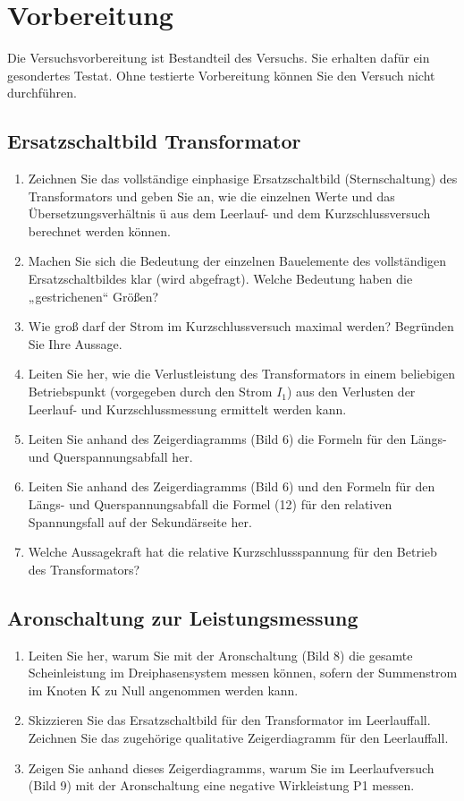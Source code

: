 \section{Vorbereitung}
{Die Versuchsvorbereitung ist Bestandteil des Versuchs. Sie erhalten dafür ein gesondertes Testat.
Ohne testierte Vorbereitung können Sie den Versuch nicht durchführen.}
\subsection{Ersatzschaltbild Transformator}
\begin{enumerate}[label=\alph*)]
  \item Zeichnen Sie das vollständige einphasige Ersatzschaltbild (Sternschaltung) des Transformators und geben Sie an, wie die einzelnen Werte und das Übersetzungsverhältnis ü aus dem Leerlauf- und dem Kurzschlussversuch berechnet werden können. 
  \item Machen Sie sich die Bedeutung der einzelnen Bauelemente des vollständigen Ersatzschaltbildes klar (wird abgefragt). Welche Bedeutung haben die „gestrichenen“ Größen? 
  \item Wie groß darf der Strom im Kurzschlussversuch maximal werden? Begründen Sie Ihre Aussage. 
  \item Leiten Sie her, wie die Verlustleistung des Transformators in einem beliebigen Betriebspunkt (vorgegeben durch den Strom $I_1$) aus den Verlusten der Leerlauf- und Kurzschlussmessung ermittelt werden kann.  
  \item Leiten Sie anhand des Zeigerdiagramms (Bild 6) die Formeln für den Längs- und Querspannungsabfall her.  
  \item Leiten Sie anhand des Zeigerdiagramms (Bild 6) und den Formeln für den Längs- und Querspannungsabfall die Formel (12) für den relativen Spannungsfall auf der Sekundärseite her. 
  \item Welche Aussagekraft hat die relative Kurzschlussspannung für den Betrieb des Transformators? 
\end{enumerate}
\subsection{Aronschaltung zur Leistungsmessung }
\begin{enumerate}[label=\alph*)]
  \item Leiten Sie her, warum Sie mit der Aronschaltung (Bild 8) die gesamte Scheinleistung im Dreiphasensystem messen können, sofern der Summenstrom im Knoten K zu Null angenommen werden kann.  
  \item Skizzieren Sie das Ersatzschaltbild für den Transformator im Leerlauffall. Zeichnen Sie das zugehörige qualitative Zeigerdiagramm für den Leerlauffall.
  \item Zeigen Sie anhand dieses Zeigerdiagramms, warum Sie im Leerlaufversuch (Bild 9) mit der Aronschaltung eine negative Wirkleistung P1 messen. 
\end{enumerate}
